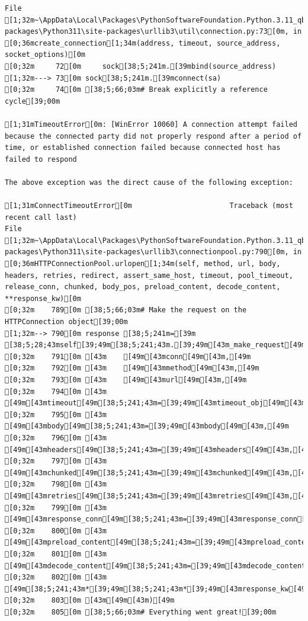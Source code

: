 \documentclass[
  letterpaper,
]{book}
\begin{document}
\begin{verbatim}
File [1;32m~\AppData\Local\Packages\PythonSoftwareFoundation.Python.3.11_qbz5n2kfra8p0\LocalCache\local-packages\Python311\site-packages\urllib3\util\connection.py:73[0m, in [0;36mcreate_connection[1;34m(address, timeout, source_address, socket_options)[0m
[0;32m     72[0m     sock[38;5;241m.[39mbind(source_address)
[1;32m---> 73[0m sock[38;5;241m.[39mconnect(sa)
[0;32m     74[0m [38;5;66;03m# Break explicitly a reference cycle[39;00m

[1;31mTimeoutError[0m: [WinError 10060] A connection attempt failed because the connected party did not properly respond after a period of time, or established connection failed because connected host has failed to respond

The above exception was the direct cause of the following exception:

[1;31mConnectTimeoutError[0m                       Traceback (most recent call last)
File [1;32m~\AppData\Local\Packages\PythonSoftwareFoundation.Python.3.11_qbz5n2kfra8p0\LocalCache\local-packages\Python311\site-packages\urllib3\connectionpool.py:790[0m, in [0;36mHTTPConnectionPool.urlopen[1;34m(self, method, url, body, headers, retries, redirect, assert_same_host, timeout, pool_timeout, release_conn, chunked, body_pos, preload_content, decode_content, **response_kw)[0m
[0;32m    789[0m [38;5;66;03m# Make the request on the HTTPConnection object[39;00m
[1;32m--> 790[0m response [38;5;241m=[39m [38;5;28;43mself[39;49m[38;5;241;43m.[39;49m[43m_make_request[49m[43m([49m
[0;32m    791[0m [43m    [49m[43mconn[49m[43m,[49m
[0;32m    792[0m [43m    [49m[43mmethod[49m[43m,[49m
[0;32m    793[0m [43m    [49m[43murl[49m[43m,[49m
[0;32m    794[0m [43m    [49m[43mtimeout[49m[38;5;241;43m=[39;49m[43mtimeout_obj[49m[43m,[49m
[0;32m    795[0m [43m    [49m[43mbody[49m[38;5;241;43m=[39;49m[43mbody[49m[43m,[49m
[0;32m    796[0m [43m    [49m[43mheaders[49m[38;5;241;43m=[39;49m[43mheaders[49m[43m,[49m
[0;32m    797[0m [43m    [49m[43mchunked[49m[38;5;241;43m=[39;49m[43mchunked[49m[43m,[49m
[0;32m    798[0m [43m    [49m[43mretries[49m[38;5;241;43m=[39;49m[43mretries[49m[43m,[49m
[0;32m    799[0m [43m    [49m[43mresponse_conn[49m[38;5;241;43m=[39;49m[43mresponse_conn[49m[43m,[49m
[0;32m    800[0m [43m    [49m[43mpreload_content[49m[38;5;241;43m=[39;49m[43mpreload_content[49m[43m,[49m
[0;32m    801[0m [43m    [49m[43mdecode_content[49m[38;5;241;43m=[39;49m[43mdecode_content[49m[43m,[49m
[0;32m    802[0m [43m    [49m[38;5;241;43m*[39;49m[38;5;241;43m*[39;49m[43mresponse_kw[49m[43m,[49m
[0;32m    803[0m [43m[49m[43m)[49m
[0;32m    805[0m [38;5;66;03m# Everything went great![39;00m


\end{verbatim}
\end{document}
